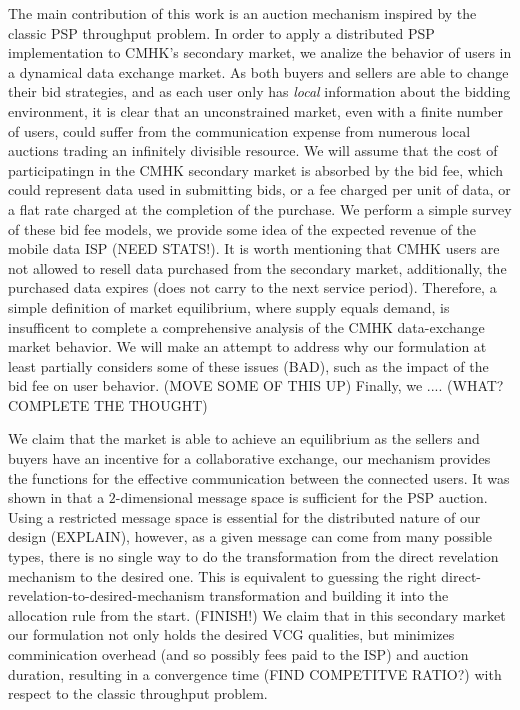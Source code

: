 \documentclass[12pt]{article}
\theoremstyle{definition}
\begin{document}
\begin{multicols}{2}
The main contribution of this work 
is an auction mechanism inspired by the classic PSP throughput problem. In
order to apply a distributed PSP implementation to CMHK's secondary market,
we analize the behavior of users in a dynamical data exchange market. As both buyers and sellers are able
to change their bid strategies, and as each user only has \emph{local}
information about the bidding environment, it is clear that an unconstrained
market, even with a finite number of users, could suffer from the communication
expense from numerous local auctions trading an infinitely divisible resource.
We will assume that the cost of participatingn in the CMHK secondary market is
absorbed by the bid fee, which could represent data used in submitting bids, or
a fee charged per unit of data, or a flat rate charged at the completion of the
purchase. We perform a simple survey of these bid fee models, we
provide some idea of the expected revenue of the mobile data ISP (NEED
STATS!). It is worth mentioning that CMHK users are not allowed to resell data purchased from the secondary
market, additionally, the purchased data expires (does not carry to the next
service period). Therefore, a simple definition of market equilibrium, where
supply equals demand, is insufficent to complete a comprehensive analysis of
the CMHK data-exchange market behavior. We will make an attempt to address why
our formulation at least partially considers some of these issues (BAD), such
as the impact of the bid fee on user behavior. (MOVE SOME OF THIS UP)
Finally, we  .... (WHAT? COMPLETE THE THOUGHT)

We claim that the market is
able to achieve an equilibrium as the sellers and buyers have an
incentive for a collaborative exchange, our mechanism provides the functions
for the effective communication between the connected users. It was shown in
\cite{lazar} that a $2$-dimensional message space is sufficient for the PSP
auction. Using a restricted message space is essential for the distributed
nature of our design (EXPLAIN), however, as a given message can come from many
possible types, there is no single
way to do the transformation from the direct revelation mechanism to the
desired one. This is equivalent to guessing the
right direct-revelation-to-desired-mechanism transformation and building it
into the allocation rule from the start. (FINISH!)
We claim that in
this secondary market our formulation not only holds the desired VCG qualities,
but minimizes comminication overhead (and so possibly fees paid to the ISP)
and auction duration, resulting in a convergence time (FIND COMPETITVE RATIO?)
with respect to the classic throughput problem. 



\end{multicols}
\end{document}
